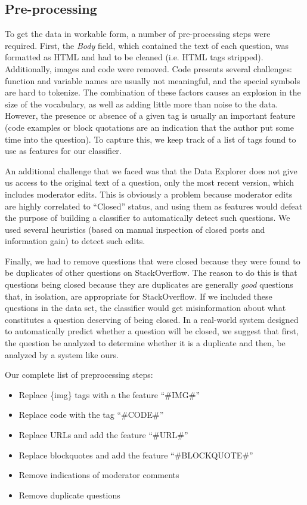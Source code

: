 \documentclass[11pt]{article}
\begin{document}
\subsection{Pre-processing}
To get the data in workable form, a number of pre-processing steps
were required. First, the \emph{Body} field, which contained the text of
each question, was formatted as HTML and had to be
cleaned (i.e. HTML tags stripped). Additionally, images and code were
removed. Code presents several challenges: function and variable names are usually not meaningful, and the special symbols are hard to tokenize. The combination of these factors causes an explosion in the size of the vocabulary, as well as adding little more than noise to the data. However, the presence or absence of a given tag is usually an important feature (code examples or block quotations are an indication that the author put some time into the question). To capture this, we keep track of a list of tags found to use as features for our classifier.

An additional challenge that we faced was that the Data Explorer does
not give us access to the original text of a question, only the most
recent version, which includes moderator edits. This is obviously a
problem because moderator edits are highly correlated to ``Closed''
status, and using them as features would defeat the purpose of
building a classifier to automatically detect such questions. We used
several heuristics (based on manual inspection of closed posts and information gain) to detect such edits.

Finally, we had to remove questions that were closed because they were
found to be duplicates of other questions on StackOverflow.  The
reason to do this is that questions being closed because they are
duplicates are generally \emph{good} questions that, in isolation, are
appropriate for StackOverflow. If we included these questions in the
data set, the classifier would get misinformation about what
constitutes a question deserving of being closed. In a real-world
system designed to automatically predict whether a question will be
closed, we suggest that first, the question be analyzed to determine
whether it is a duplicate and then, be analyzed by a system like ours.

Our complete list of preprocessing steps:

\begin{itemize}
\item Replace \{img\} tags with a the feature ``\#IMG\#''
\item Replace code with the tag ``\#CODE\#''
\item Replace URLs and add the feature ``\#URL\#''
\item Replace blockquotes and add the feature ``\#BLOCKQUOTE\#''
\item Remove indications of moderator comments
\item Remove duplicate questions
\end{itemize}
\end{document}
